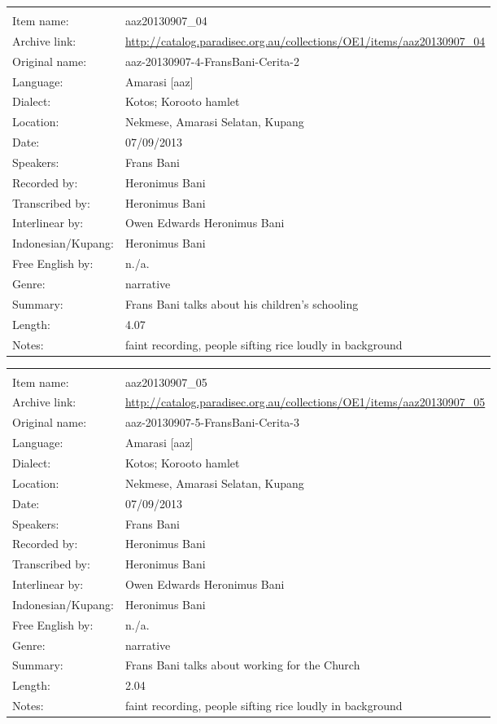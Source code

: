 \newpage
\noindent
\wg\begin{tabular}{lL{.67\textwidth}}
			& \\
Item name:			& aaz20130907{\_}04 \\
Archive link:			& \url{http://catalog.paradisec.org.au/collections/OE1/items/aaz20130907_04 }\\
Original name:			& aaz-20130907-4-FransBani-Cerita-2\\
Language:				& Amarasi [aaz] \\
Dialect:				& Kotos; Koro{\Q}oto hamlet \\
Location:				& Nekmese{\Q}, Amarasi Selatan, Kupang \\
Date:				& 07/09/2013\\
Speakers:				& Frans Bani\\
Recorded by:			& Heronimus Bani\\
Transcribed by:		& Heronimus Bani\\
Interlinear by:		& Owen Edwards Heronimus Bani\\
Indonesian/Kupang:		& Heronimus Bani\\
Free English by:		& n./a.\\
Genre:				& narrative\\
Summary:				& Frans Bani talks about his children's schooling\\
Length:				& 4.07\\
Notes:				& faint recording, people sifting rice loudly in background\\
\end{tabular}

\newpage
\noindent
\wg\begin{tabular}{lL{.67\textwidth}}
			& \\
Item name:			& aaz20130907{\_}05\\
Archive link:			& \url{http://catalog.paradisec.org.au/collections/OE1/items/aaz20130907_05}\\
Original name:			& aaz-20130907-5-FransBani-Cerita-3\\
Language:				& Amarasi [aaz] \\
Dialect:				& Kotos; Koro{\Q}oto hamlet \\
Location:				& Nekmese{\Q}, Amarasi Selatan, Kupang \\
Date:				& 07/09/2013\\
Speakers:				& Frans Bani\\
Recorded by:			& Heronimus Bani\\
Transcribed by:		& Heronimus Bani\\
Interlinear by:		& Owen Edwards Heronimus Bani\\
Indonesian/Kupang:		& Heronimus Bani\\
Free English by:		& n./a.\\
Genre:				& narrative\\
Summary:				& Frans Bani talks about working for the Church\\
Length:				& 2.04\\
Notes:				& faint recording, people sifting rice loudly in background\\
\end{tabular}

